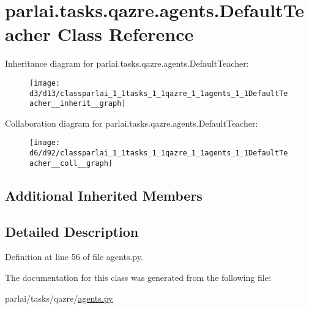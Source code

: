 \hypertarget{classparlai_1_1tasks_1_1qazre_1_1agents_1_1DefaultTeacher}{}\section{parlai.\+tasks.\+qazre.\+agents.\+Default\+Teacher Class Reference}
\label{classparlai_1_1tasks_1_1qazre_1_1agents_1_1DefaultTeacher}


Inheritance diagram for parlai.\+tasks.\+qazre.\+agents.\+Default\+Teacher\+:\nopagebreak
\begin{figure}[H]
\begin{center}
\leavevmode
\texttt{[image: d3/d13/classparlai\_1\_1tasks\_1\_1qazre\_1\_1agents\_1\_1DefaultTeacher\_\_inherit\_\_graph]}
\end{center}
\end{figure}


Collaboration diagram for parlai.\+tasks.\+qazre.\+agents.\+Default\+Teacher\+:\nopagebreak
\begin{figure}[H]
\begin{center}
\leavevmode
\texttt{[image: d6/d92/classparlai\_1\_1tasks\_1\_1qazre\_1\_1agents\_1\_1DefaultTeacher\_\_coll\_\_graph]}
\end{center}
\end{figure}
\subsection*{Additional Inherited Members}


\subsection{Detailed Description}


Definition at line 56 of file agents.\+py.



The documentation for this class was generated from the following file\+:\begin{DoxyCompactItemize}
\item 
parlai/tasks/qazre/\hyperlink{parlai_2tasks_2qazre_2agents_8py}{agents.\+py}\end{DoxyCompactItemize}
